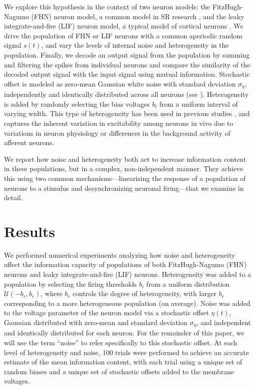 \documentclass[12pt]{article}
\begin{document}
We explore this hypothesis in the context of two neuron models:
the FitzHugh-Nagumo (FHN) neuron model,
a common model in SR research \citep{Wiesenfeld1994,Collins1995,Longtin1998,Stocks2001},
and the leaky integrate-and-fire (LIF) neuron model,
a typical model of cortical neurons \citep{Koch1999}.
We drive the population of FHN or LIF neurons
with a common aperiodic random signal $s(t)$,
and vary the levels of internal noise and heterogeneity in the population.
Finally, we decode an output signal from the population
by summing and filtering the spikes from individual neurons
and compare the similarity of the decoded output signal
with the input signal using mutual information.
Stochastic offset is modeled as zero-mean Gaussian white noise with standard deviation $\sigma_\eta$, independently and identically distributed across all neurons (see \textsc{}). Heterogeneity is added by randomly selecting
the bias voltages $b_i$ from a uniform interval of varying width.
This type of heterogeneity has been used in previous studies \citep[e.g.,][]{Brody2003},
and captures the inherent variation in excitability among neurons in vivo \citep{Mejias2012} due to variations in neuron physiology or differences in the background activity of afferent neurons.

We report how noise and heterogeneity both act to increase information content in these populations, but in a complex, non-independent manner. They achieve this using two common mechanisms---linearizing the response of a population of neurons to a stimulus and desynchronizing neuronal firing---that we examine in detail.

\section{Results}
\label{scn:results}

We performed numerical experiments analyzing how noise and heterogeneity affect the information capacity of populations of both FitzHugh-Nagumo (FHN) neurons and leaky integrate-and-fire (LIF) neurons. Heterogeneity was added to a population by selecting the firing thresholds ${b_i}$ from a uniform distribution $\mathcal{U}(-b_r, b_r)$, where $b_r$ controls the degree of heterogeneity, with larger $b_r$ corresponding to a more heterogeneous population (on average). Noise was added to the voltage parameter of the neuron model via a stochastic offset $\eta(t)$, Gaussian distributed with zero-mean and standard deviation $\sigma_\eta$, and independent and identically distributed for each neuron. For the remainder of this paper, we will use the term ``noise'' to refer specifically to this stochastic offset. At each level of heterogeneity and noise, 100 trials were performed to achieve an accurate estimate of the mean information content, with each trial using a unique set of random biases and a unique set of stochastic offsets added to the membrane voltages.
\end{document}
